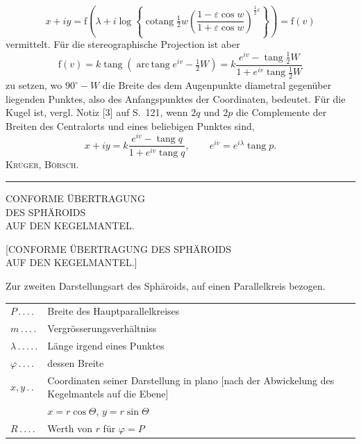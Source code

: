 \[
x+iy=\mathrm f\left(\lambda+i\log\left\{\operatorname{cotang}\tfrac12w\left(\frac{1-\varepsilon\cos w}{1+\varepsilon\cos w}\right)^{\frac12\varepsilon}\right\}\right)=\mathrm f(v)
\]
vermittelt. Für die stereographische Projection ist aber
\[
\mathrm f(v)=k\operatorname{tang}(\operatorname{arc\,tang}e^{iv}-\tfrac12W)=k\frac{e^{iv}-\operatorname{tang}\tfrac12W}{1+e^{iv}\operatorname{tang}\tfrac12W}
\]
zu setzen, wo $90^\circ-W$ die Breite des dem Augenpunkte diametral gegenüber liegenden Punktes, also des Anfangspunktes der Coordinaten, bedeutet. Für die Kugel ist, vergl. Notiz [3] auf S.~121, wenn $2q$ und $2p$ die Complemente der Breiten des Centralorts und eines beliebigen Punktes sind,
\[
x+iy=k\frac{e^{iv}-\operatorname{tang}q}{1+e^{iv}\operatorname{tang}q},\qquad e^{iv}=e^{i\lambda}\operatorname{tang}p.
\]
\hfill\textsc{Krüger, Börsch.}\par
\begin{center}\rule{.24\textwidth}{.4pt}\end{center}
\par\endgroup
\clearpage
\null\vfill
\begin{center}
{\LARGE CONFORME ÜBERTRAGUNG\\[8pt]DES SPHÄROIDS\\[8pt]AUF DEN KEGELMANTEL.}
\end{center}
\vfill\null
\clearpage
\null
\clearpage
\begin{center}
{\LARGE{}}\par\vspace{13mm}
{\large [CONFORME ÜBERTRAGUNG DES SPHÄROIDS\\AUF DEN KEGELMANTEL.]}
\end{center}
Zur zweiten Darstellungsart des Sphäroids, auf einen Parallelkreis bezogen.
\begin{center}
\begin{tabular}{@{}l@{ }p{}@{}}
$P\, .\, .\, .\, .$&Breite des Hauptparallelkreises\\[3pt]
$m\, .\, .\, .\, .$&Vergrösserungsverhältniss\\[3pt]
$\lambda\, .\, .\, .\, .\, .$&Länge irgend eines Punktes\\[3pt]
$\varphi\, .\, .\, .\, .$&dessen Breite\\[3pt]
$x,y\, .\, .$&Coordinaten seiner Darstellung in plano [nach der Abwickelung des Kegelmantels auf die Ebene]\\
&\hspace{3em}$x=r\cos\Theta$, $y=r\sin\Theta$\\[3pt]
$R\, .\, .\, .\, .$&Werth von $r$ für $\varphi=P$
\end{tabular}
\end{center}
